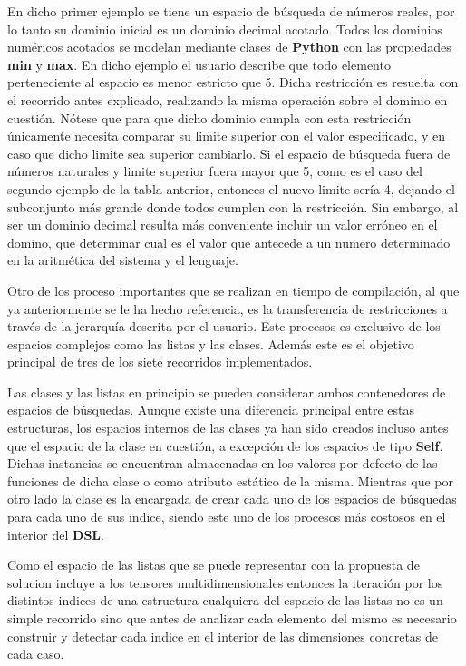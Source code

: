 En dicho primer ejemplo se tiene un espacio de búsqueda de números reales, por lo tanto su dominio inicial es un dominio decimal acotado.
Todos los dominios numéricos acotados se modelan mediante clases de {\bf Python} con las propiedades {\bf min} y {\bf max}. 
En dicho ejemplo el usuario describe que todo elemento perteneciente
al espacio es menor estricto que 5. Dicha restricción es resuelta con el recorrido antes explicado, realizando la misma operación sobre
el dominio en cuestión. Nótese que para que dicho dominio cumpla con esta restricción únicamente necesita comparar su limite superior
con el valor especificado, y en caso que dicho limite sea superior cambiarlo. Si el espacio de búsqueda fuera de números naturales y
limite superior fuera mayor que 5, como es el caso del segundo ejemplo de la tabla anterior, entonces el nuevo limite sería 4, dejando
el subconjunto más grande donde todos cumplen con la restricción. Sin embargo, al ser un dominio decimal resulta más conveniente
incluir un valor erróneo en el domino, que determinar cual es el valor que antecede a un numero determinado en la aritmética del
sistema y el lenguaje.

Otro de los proceso importantes que se realizan en tiempo de compilación, al que ya anteriormente se le ha hecho referencia,
es la transferencia de restricciones a través de la jerarquía descrita por el usuario. Este procesos es exclusivo de los espacios
complejos como las listas y las clases. Además este es el objetivo principal de tres de los siete recorridos implementados.

Las clases y las listas en principio se pueden considerar ambos contenedores de espacios de búsquedas. Aunque existe una diferencia
principal entre estas estructuras, los espacios internos de las clases ya han sido creados incluso antes que el espacio de la clase
en cuestión, a excepción de los espacios de tipo {\bf Self}. Dichas instancias se encuentran almacenadas en los valores por defecto de
las funciones de dicha clase o como atributo estático de la misma. Mientras que por otro lado la clase  es la
encargada de crear cada uno de los espacios de búsquedas para cada uno de sus indice, siendo este uno de los procesos más costosos
en el interior del {\bf DSL}.

Como el espacio de las listas que se puede representar con la propuesta de solucion incluye a los tensores
multidimensionales entonces la iteración por los distintos indices de una estructura cualquiera del espacio de las listas no es un
simple recorrido sino que antes de analizar cada elemento del mismo es necesario construir y detectar cada indice en el interior
de las dimensiones concretas de cada caso.

